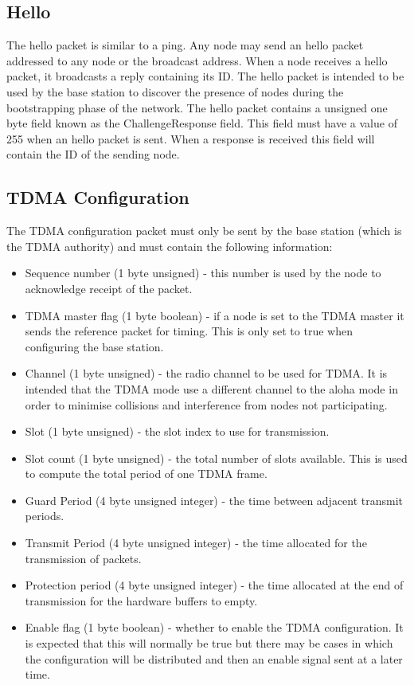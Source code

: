 \documentclass[parskip]{cs4rep}
\begin{document}
\subsection{Hello}

The hello packet is similar to a ping. Any node may send an hello packet addressed to any node or the broadcast address. When a node receives a hello packet, it broadcasts a reply containing its ID. The hello packet is intended to be used by the base station to discover the presence of nodes during the bootstrapping phase of the network. The hello packet contains a unsigned one byte field known as the ChallengeResponse field. This field must have a value of 255 when an hello packet is sent. When a response is received this field will contain the ID of the sending node.

\subsection{TDMA Configuration}

The TDMA configuration packet must only be sent by the base station (which is the TDMA authority) and must contain the following information:

\begin{itemize}
\item
Sequence number (1 byte unsigned) - this number is used by the node to acknowledge receipt of the packet.
\item
TDMA master flag (1 byte boolean) - if a node is set to the TDMA master it sends the reference packet for timing. This is only set to true when configuring the base station.
\item
Channel (1 byte unsigned)  - the radio channel to be used for TDMA. It is intended that the TDMA mode use a different channel to the aloha mode in order to minimise collisions and interference from nodes not participating.
\item
Slot (1 byte unsigned) - the slot index to use for transmission.
\item
Slot count  (1 byte unsigned) - the total number of slots available. This is used to compute the total period of one TDMA frame.
\item
Guard Period (4 byte unsigned integer) - the time between adjacent transmit periods.
\item
Transmit Period (4 byte unsigned integer) - the time allocated for the transmission of packets.
\item
Protection period (4 byte unsigned integer) - the time allocated at the end of transmission for the hardware buffers to empty.
\item
Enable flag (1 byte boolean) - whether to enable the TDMA configuration. It is expected that this will normally be true but there may be cases in which the configuration will be distributed and then an enable signal sent at a later time.
\end{itemize}
\end{document}
